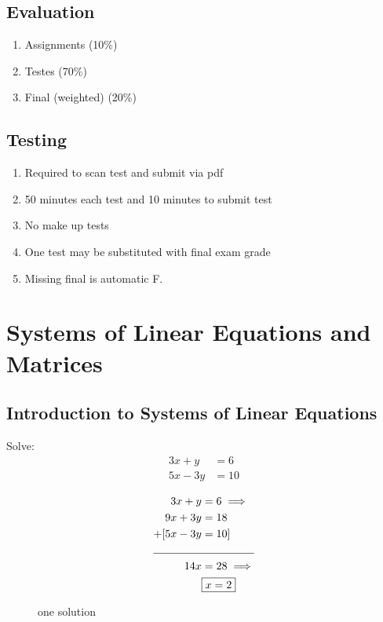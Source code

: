 \documentclass[a4paper,11pt,twoside]{report}
\begin{document}
\subsection{Evaluation}%
\label{ssec:evaluation}

\begin{enumerate}
	\item Assignments (10\%)
	\item Testes (70\%)
	\item Final (weighted) (20\%)
\end{enumerate}

\subsection{Testing}%
\label{sub:testing}

\begin{enumerate}
	\item Required to scan test and submit via pdf
	\item 50 minutes each test and 10 minutes to submit test
	\item No make up tests
	\item One test may be substituted with final exam grade
	\item Missing final is automatic F.
\end{enumerate}

\section{Systems of Linear Equations and Matrices}%
\label{sec:systems_of_linear_equations_and_matric}

\subsection{Introduction to Systems of Linear Equations}%
\label{sub:introduction_to_systems_of_linear_equations}

\begin{example}

Solve:
\begin{align*}
	3x + y &= 6 \\
	5x -3y &= 10
\end{align*}
\end{example}

\begin{solution}[]
	\begin{align*}
		3x + y &= 6 \implies \\
		9x + 3y &= 18 \\
		+[5x -3y &= 10] \\
		\cline{1-2}
		14x &= 28 \implies \\
			&\boxed{x = 2}
	\end{align*}
\end{solution}
\begin{figure}[ht]
    \centering
    \caption{one solution}
    \label{fig:one-solution}
\end{figure}
\end{document}
